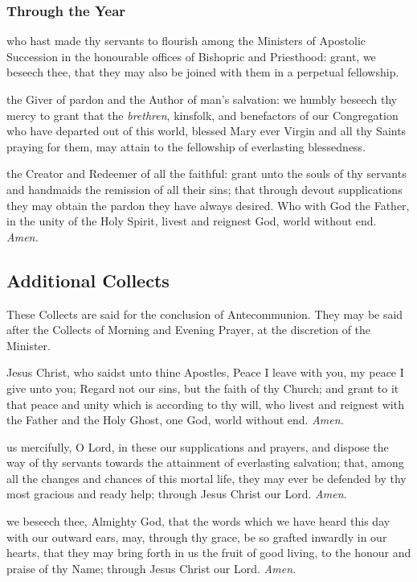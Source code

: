 \subsubsection{Through the Year}
 who hast made thy servants to flourish among the Ministers of Apostolic Succession in the honourable offices of Bishopric and Priesthood: grant, we beseech thee, that they may also be joined with them in a perpetual fellowship.

 the Giver of pardon and the Author of man's salvation: we humbly beseech thy mercy to grant that the \textit{brethren}, kinsfolk, and benefactors of our Congregation who have departed out of this world, blessed Mary ever Virgin and all thy Saints praying for them, may attain to the fellowship of everlasting blessedness.

 the Creator and Redeemer of all the faithful: grant unto the souls of thy servants and handmaids the remission of all their sins; that through devout supplications they may obtain the pardon they have always desired. Who with God the Father, in the unity of the Holy Spirit, livest and reignest God, world without end. \textit{Amen.}

\clearpage
\subsection{Additional Collects}\label{AdditionalCollects}
\begin{rubric}
    These Collects are said for the conclusion of Antecommunion. They may be said after the Collects of Morning and Evening Prayer, at the discretion of the Minister.
\end{rubric}
 Jesus Christ, who saidst unto thine Apostles, Peace I leave with you, my peace I give unto you; Regard not our sins, but the faith of thy Church; and grant to it that peace and unity which is according to thy will, who livest and reignest with the Father and the Holy Ghost, one God, world without end. \textit{Amen.}

 us mercifully, O Lord, in these our supplications and prayers, and dispose the way of thy servants towards the attainment of everlasting salvation; that, among all the changes and chances of this mortal life, they may ever be defended by thy most gracious and ready help; through Jesus Christ our Lord. \textit{Amen.}

 we beseech thee, Almighty God, that the words which we have heard this day with our outward ears, may, through thy grace, be so grafted inwardly in our hearts, that they may bring forth in us the fruit of good living, to the honour and praise of thy Name; through Jesus Christ our Lord. \textit{Amen.}

